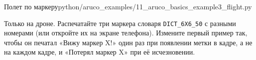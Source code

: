\begin{codefiletitle}[python]{Полет по маркеру}{python/aruco_examples/11_aruco_basics_example3_flight.py}
\end{codefiletitle}

\begin{taskbox}
Только на дроне. Распечатайте три маркера словаря \texttt{DICT\_6X6\_50} с разными номерами (или откройте их на экране телефона). Измените первый пример так, чтобы он печатал «Вижу маркер X!» один раз при появлении метки в кадре, а не на каждом кадре, и «Потерял маркер X» при её исчезновении.
\end{taskbox}
